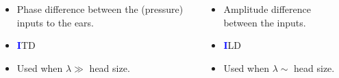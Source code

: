 \documentclass{beamer}
\begin{document}
\begin{frame}[t]
\begin{exampleblock}
{\begin{columns}
  \end{columns}
  
    \begin{columns}
 
    \begin{column}{0.5\textwidth}
    \small
     \begin{itemize}
    \item Phase difference between the (pressure) inputs to the ears.
    \item \textbf{\textcolor{blue}{I}}TD
    \item Used when $\lambda\gg$ head size.
     \end{itemize}
    \end{column}
     
    \begin{column}{0.5\textwidth}
    \small
     \begin{itemize}
          \item Amplitude difference between the inputs.
          \item \textbf{\textcolor{blue}{I}}LD
          \item Used when $\lambda\sim$ head size.
     \end{itemize}
    \end{column}
    

\end{columns}}
\end{exampleblock}
\end{frame}
\end{document}
